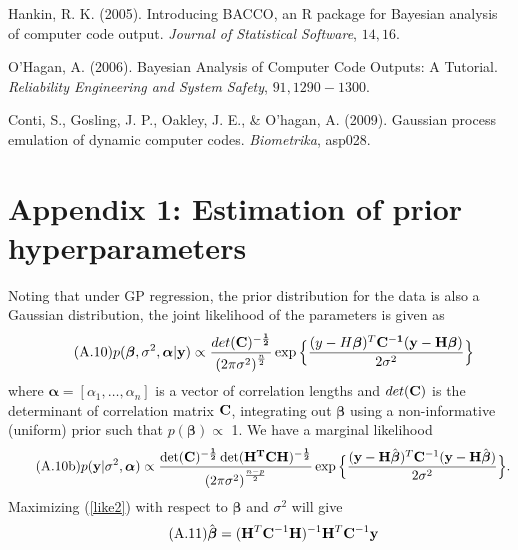 \documentclass[12pt,titlepage]{report}
\newcommand{\bH}{{\bf H}}
\newcommand{\bC}{{\bf C}}
\newcommand{\by}{{\bf y}}
\newcommand{\hbbeta}{{\hat{\boldsymbol{\beta}}}}
\theoremstyle{definition}
\theoremstyle{remark}
\begin{document}
\begin{thebibliography}{94}
 Hankin, R. K. (2005). Introducing BACCO, an R package for Bayesian analysis of computer code output. {\it Journal of Statistical Software}, $14, 16$.

 O'Hagan, A. (2006). Bayesian Analysis of Computer Code Outputs: A Tutorial. {\it Reliability Engineering and System Safety}, $91, 1290-1300$.

 Conti, S., Gosling, J. P., Oakley, J. E., \& O'hagan, A. (2009). Gaussian process emulation of dynamic computer codes. {\it Biometrika}, asp028.

\end{thebibliography}{}

\section*{Appendix 1: Estimation of prior hyperparameters}\label{hyper}
Noting that under GP regression, the prior distribution for the data is also a Gaussian distribution, the joint likelihood of the parameters is given as
\begin{equation}\tag{A.10}\label{like}
p(\boldsymbol \beta, \sigma^2, \boldsymbol{\alpha}|\by)\propto \frac{det(\bf C)^{-\frac{1}{2}}}{{(2\pi\sigma^2)}^\frac{n}{2}}\exp \Big \{\frac{(y-H\boldsymbol \beta)^T \bf C^{-1}(\by-H\boldsymbol \beta)}{2\sigma^2}\Big\}
\end{equation}
where $\boldsymbol{\alpha}=[\alpha_1, \ldots, \alpha_n]$ is a vector of correlation lengths and $det(\bf C)$ is the determinant of correlation matrix $\bf C$, integrating out $\boldsymbol \beta$ using a non-informative (uniform) prior such that $p(\boldsymbol \beta) \propto$ 1. We have a marginal likelihood
\begin{equation}\tag{A.10b}\label{like2}
p(\by|\sigma^2, \boldsymbol{\alpha})\propto \frac{\det(\bf C)^{-\frac{1}{2}}\det(H^TCH)^{-\frac{1}{2}}}{{(2\pi\sigma^2)}^\frac{n-p}{2}}\exp \Big \{\frac{(\by-\bH\hbbeta)^T \bC^{-1}(\by-\bH\hbbeta)}{2\sigma^2}\Big\}.
\end{equation}
Maximizing (\ref{like2}) with respect to $\boldsymbol \beta$ and $\sigma^2$ will give %
\begin{equation}\tag{A.11}
\hbbeta=(\bH^T\bC^{-1}\bH)^{-1}\bH^T\bC^{-1}\by
\end{equation}
\end{document}
